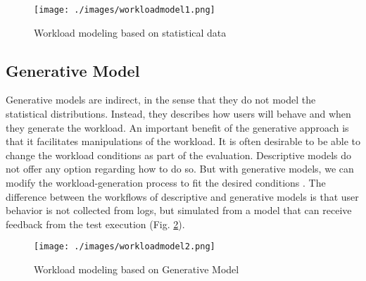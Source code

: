 \begin{figure}[!ht]
\centering
\texttt{[image: ./images/workloadmodel1.png]}
\caption{Workload modeling based on statistical data \cite{DiLucca2006}}
\label{fig:descriptivemodel}
\end{figure}

\subsection{Generative Model}

Generative models are indirect, in the sense that they do not model the statistical distributions. Instead, they describes how users will behave and when they generate the workload. An important benefit of the generative approach is
that it facilitates manipulations of the workload. It is often desirable to be able to change the workload conditions as part of the evaluation. Descriptive models do not offer any option regarding how to do so. But with generative models, we can modify the workload-generation process to fit the desired conditions \cite{DiLucca2006}. The difference between the workflows of descriptive and generative models is that user behavior is not collected from logs, but simulated from a model that can receive feedback from the test execution (Fig. \ref{fig:generativemodel}).

\begin{figure}[!ht]
\centering
\texttt{[image: ./images/workloadmodel2.png]}
\caption{Workload modeling based on Generative Model \cite{DiLucca2006}}
\label{fig:generativemodel}
\end{figure}